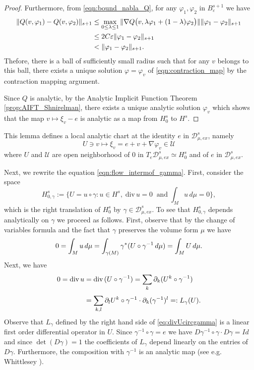 \documentclass[11pt]{amsart}
\numberwithin{equation}{section}
\begin{document}
\begin{proof}
Furthermore, from \eqref{eqn:bound_nabla_Q}, for any $\varphi_1,\varphi_2$ in $B_{\varepsilon}^{s+1}$ we have 
%
    \begin{align}
    \|Q(v,\varphi_1)-Q(v,\varphi_2)\|_{s+1}&\le \max_{0\le \lambda\le 1}\|\nabla Q\big(v,\lambda\varphi_1+(1-\lambda)\varphi_2\big)\| \|\varphi_1-\varphi_2\|_{s+1}\notag\\
    &\le 2C\varepsilon \|\varphi_1-\varphi_2\| _{s+1}\\
    &<  \|\varphi_1-\varphi_2\| _{s+1}.\notag
\end{align}
%
    Thefore, there is a ball of sufficiently small radius such that for any $v$ belongs to this ball, there exists a unique solution $\varphi=\varphi_v$ of \eqref{eqn:contraction_map} by the contraction mapping argument. 
    
    Since $Q$ is analytic, by the Analytic Implicit Function Theorem \ref{prop:AIFT_Shnirelman}, there exists a unique analytic solution $\varphi_v$ which shows that the map $v\mapsto\xi_v-e$ is analytic  as a map from $H_0^s$ to $H^s$.

 \end{proof}
This lemma defines a local analytic chart at the identity $e$ in $\mathcal{D}_{\mu,ex}^{s}$, namely
%
$$U\ni v\mapsto \xi_v=e+v+\nabla\varphi_v\in\mathcal{U}$$
%
where $U$ and $\mathcal{U}$ are open neighborhood of $0$ in $T_e\mathcal{D}_{\mu,ex}^s\simeq H_0^s$ and of $e$ in $\mathcal{D}_{\mu,ex}^{s}$.
 
Next, we rewrite the equation \eqref{eqn:flow_intermof_gamma}.
	First, consider the space 
    $$H_{0,\gamma}^s:=\Big\{ U=u\circ \gamma: u\in H^s,\; \text{div}\,u=0\;\; \text{and}\; \int_{M}u\,d\mu=0\Big\},$$
    which is the right translation of $H_0^s$ by $\gamma\in \mathcal{D}_{\mu,ex}^s.$
To see that $H_{0,\gamma}^s$ depends analytically on $\gamma$ we proceed as follows. First, observe that by the change of variables formula and the fact that $\gamma$ preserves the volume form $\mu$ we have
\begin{align}
   0= \int_{M}u\,d\mu=\int_{\gamma(M)}\gamma^\ast(U\circ\gamma^{-1}\,d\mu)=\int_{M}U\,d\mu.\notag
\end{align}
Next, we have
	\begin{align}\label{eq:divUcircgamma}
		0=\text{div}\,u&=\text{div} \,(U\circ \gamma^{-1})=\sum_{k} \partial_{k} (U^k\circ\gamma^{-1})\notag\\
        &=\sum_{k,l}^{}\partial_lU^{k}\circ \gamma^{-1}\cdot\partial_k(\gamma^{-1})^{l}
        =:L_\gamma(U).
	\end{align}	
   Observe that $L_\gamma$ defined by the right hand side of \eqref{eq:divUcircgamma} is a linear first order differential operator in $U$. Since $\gamma^{-1}\circ\gamma=e$ we have $D\gamma^{-1}\circ\gamma \cdot D\gamma=Id$ and since $\det (D\gamma)=1$ the coefficients of $L_\gamma$ depend linearly on the entries of $D\gamma$. Furthermore, the composition with $\gamma^{-1}$ is an analytic map (see e.g. Whittlesey \cite{Whittlesey1965}). 
   
\end{document}
